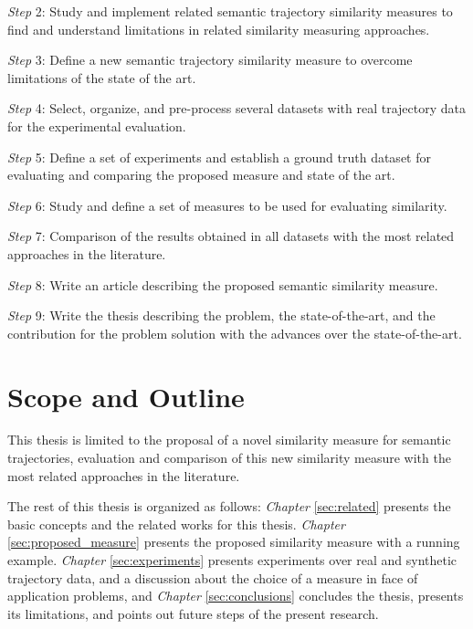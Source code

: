 \textit{Step} 2: Study and implement related semantic trajectory similarity measures to find and understand limitations in related similarity measuring approaches.

\textit{Step} 3: Define a new semantic trajectory similarity measure to overcome limitations of the state of the art.

\textit{Step} 4: Select, organize, and pre-process several datasets with real trajectory data for the experimental evaluation.%

\textit{Step} 5: Define a set of experiments and establish a ground truth dataset for evaluating and comparing the proposed measure and state of the art.

\textit{Step} 6: Study and define a set of measures to be used for evaluating similarity.

\textit{Step} 7: Comparison of the results obtained in all datasets with the most related approaches in the literature.

\textit{Step} 8: Write an article describing the proposed semantic similarity measure.

\textit{Step} 9: Write the thesis describing the problem, the state-of-the-art, and the contribution for the problem solution with the advances over the state-of-the-art.

\section{Scope and Outline}

This thesis is limited to the proposal of a novel similarity measure for semantic trajectories, evaluation and comparison of this new similarity measure with the most related approaches in the literature. 

The rest of this thesis is organized as follows: \textit{Chapter} \ref{sec:related} presents the basic concepts and the related works for this thesis. \textit{Chapter} \ref{sec:proposed_measure} presents the proposed similarity measure with a running example. \textit{Chapter} \ref{sec:experiments} presents experiments over real and synthetic trajectory data, and a discussion about the choice of a measure in face of application problems, and \textit{Chapter} \ref{sec:conclusions} concludes the   thesis, presents its limitations, and points out future steps of the present research.
